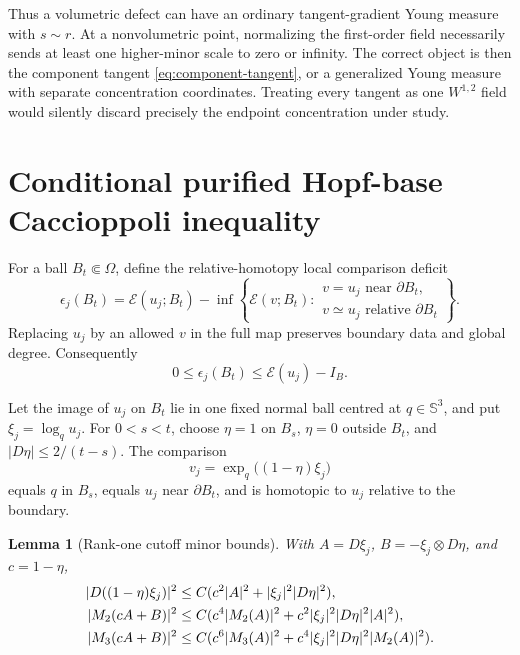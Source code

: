 \documentclass[10pt]{article}
\newtheorem{lemma}[theorem]{Lemma}
\newcommand{\SSS}{\mathbb S}
\newcommand{\cE}{\mathcal E}
\begin{document}
Thus a volumetric defect can have an ordinary tangent-gradient Young measure
with $s\sim r$.  At a nonvolumetric point, normalizing the first-order field
necessarily sends at least one higher-minor scale to zero or infinity.
The correct object is then the component tangent
\eqref{eq:component-tangent}, or a generalized Young measure with separate
concentration coordinates.  Treating every tangent as one $W^{1,2}$ field
would silently discard precisely the endpoint concentration under study.

\section{Conditional purified Hopf-base Caccioppoli inequality}

For a ball $B_t\Subset\Omega$, define the relative-homotopy local comparison
deficit
\begin{equation}
 \epsilon_j(B_t)=\cE(u_j;B_t)-
 \inf\left\{\cE(v;B_t):
 \begin{array}{l}
 v=u_j\text{ near }\partial B_t,\\
 v\simeq u_j\text{ relative }\partial B_t
 \end{array}\right\}.
 \label{eq:local-deficit}
\end{equation}
Replacing $u_j$ by an allowed $v$ in the full map preserves boundary data
and global degree.  Consequently
\begin{equation}
 0\leq\epsilon_j(B_t)\leq\cE(u_j)-I_B.
 \label{eq:deficit-global}
\end{equation}

Let the image of $u_j$ on $B_t$ lie in one fixed normal ball centred at
$q\in\SSS^3$, and put $\xi_j=\log_q u_j$.  For
$0<s<t$, choose $\eta=1$ on $B_s$, $\eta=0$ outside $B_t$, and
$|D\eta|\leq2/(t-s)$.  The comparison
\begin{equation}
 v_j=\exp_q\bigl((1-\eta)\xi_j\bigr)
 \label{eq:competitor}
\end{equation}
equals $q$ in $B_s$, equals $u_j$ near $\partial B_t$, and is homotopic to
$u_j$ relative to the boundary.

\begin{lemma}[Rank-one cutoff minor bounds]
With $A=D\xi_j$, $B=-\xi_j\otimes D\eta$, and $c=1-\eta$,
\begin{align}
 |D((1-\eta)\xi_j)|^2
 &\leq C(c^2|A|^2+|\xi_j|^2|D\eta|^2),\notag\\
 |M_2(cA+B)|^2
 &\leq C(c^4|M_2(A)|^2
          +c^2|\xi_j|^2|D\eta|^2|A|^2),\notag\\
 |M_3(cA+B)|^2
 &\leq C(c^6|M_3(A)|^2
          +c^4|\xi_j|^2|D\eta|^2|M_2(A)|^2).
 \label{eq:rank-one-bounds}
\end{align}
\end{lemma}
\end{document}
